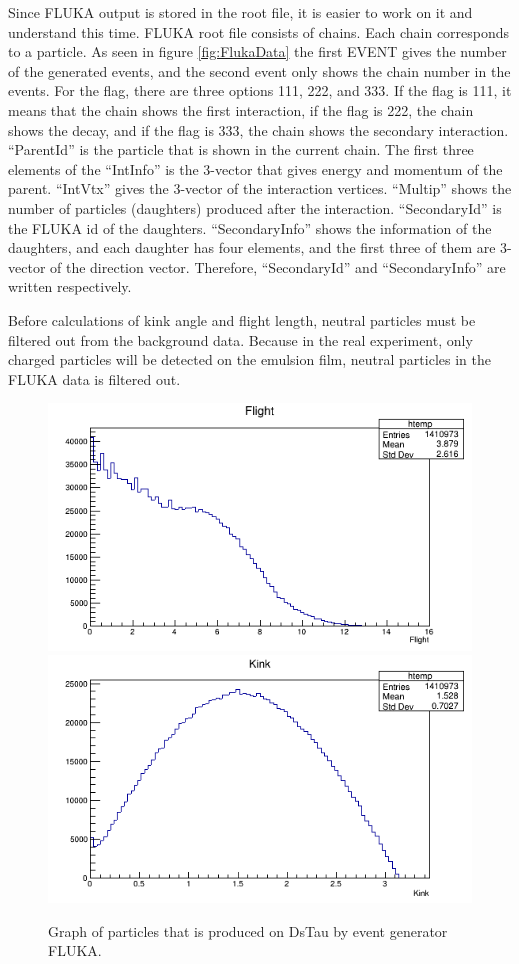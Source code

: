 \documentclass[12pt]{report}
\begin{document}
Since FLUKA output is stored in the root file, it is easier to work on it and understand this time. FLUKA root file consists of chains. Each chain corresponds to a particle. As seen in figure \ref{fig:FlukaData} the first EVENT gives the number of the generated events, and the second event only shows the chain number in the events. For the flag, there are three options 111, 222, and 333. If the flag is 111, it means that the chain shows the first interaction, if the flag is 222, the chain shows the decay, and if the flag is 333, the chain shows the secondary interaction. “ParentId” is the particle that is shown in the current chain. The first three elements of the “IntInfo” is the 3-vector that gives energy and momentum of the parent. “IntVtx” gives the 3-vector of the interaction vertices. “Multip” shows the number of particles (daughters) produced after the interaction. “SecondaryId” is the FLUKA id of the daughters. “SecondaryInfo” shows the information of the daughters, and each daughter has four elements, and the first three of them are 3-vector of the direction vector. Therefore, “SecondaryId” and “SecondaryInfo” are written respectively.

Before calculations of kink angle and flight length, neutral particles must be filtered out from the background data. Because in the real experiment, only charged particles will be detected on the emulsion film, neutral particles in the FLUKA data is filtered out.

\begin{figure}[htp]
\centering
\includegraphics[width = 7 cm]{FlukaFLength.png}
\includegraphics[width = 7 cm]{FlukaKAngle.png}
\caption{Graph of particles that is produced on DsTau by event generator FLUKA.}
\label{fig:FlukaRoot}
\end{figure}
\end{document}
